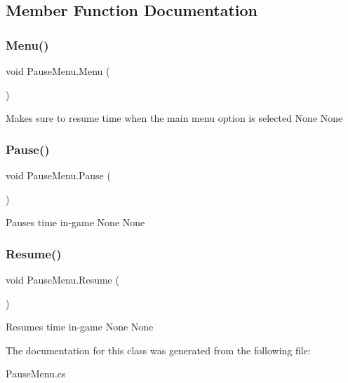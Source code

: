\subsection{Member Function Documentation}
\mbox{\label{class_pause_menu_ad9f370d76d1af2ebdda21eaae4ea5477}} 
\subsubsection{\texorpdfstring{Menu()}{Menu()}}
{\footnotesize\ttfamily void Pause\+Menu.\+Menu (\begin{DoxyParamCaption}{ }\end{DoxyParamCaption})\hspace{0.3cm}{\ttfamily [inline]}}

Makes sure to resume time when the main menu option is selected  None  None \mbox{\label{class_pause_menu_a712dac1268693262de144337e2835ea7}} 
\subsubsection{\texorpdfstring{Pause()}{Pause()}}
{\footnotesize\ttfamily void Pause\+Menu.\+Pause (\begin{DoxyParamCaption}{ }\end{DoxyParamCaption})\hspace{0.3cm}{\ttfamily [inline]}}

Pauses time in-\/game  None  None \mbox{\label{class_pause_menu_a4416b25e65dfadf57cd8657eaf94f7df}} 
\subsubsection{\texorpdfstring{Resume()}{Resume()}}
{\footnotesize\ttfamily void Pause\+Menu.\+Resume (\begin{DoxyParamCaption}{ }\end{DoxyParamCaption})\hspace{0.3cm}{\ttfamily [inline]}}

Resumes time in-\/game  None  None 

The documentation for this class was generated from the following file\+:\begin{DoxyCompactItemize}
\item 
Pause\+Menu.\+cs\end{DoxyCompactItemize}
